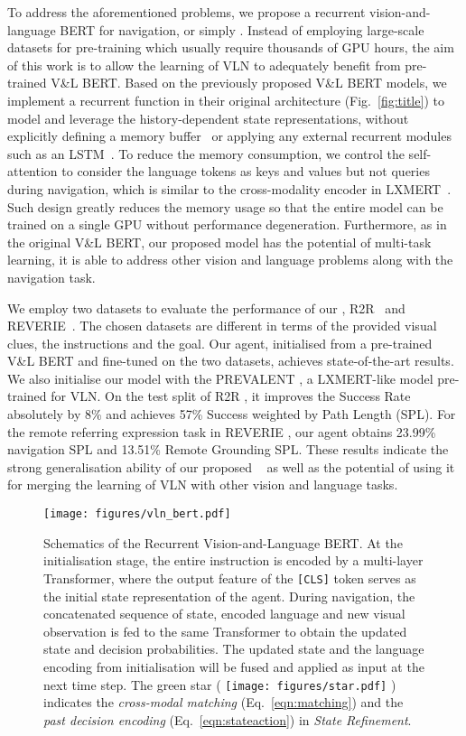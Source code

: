 \documentclass[final]{cvpr}
\DeclareRobustCommand{\star}{\begingroup\normalfont
  \texttt{[image: figures/star.pdf]}\endgroup
}
\begin{document}
To address the aforementioned problems, we propose a recurrent vision-and-language BERT for navigation, or simply \vlnbert. Instead of employing large-scale datasets for pre-training which usually require thousands of GPU hours, the aim of this work is to allow the learning of VLN to adequately benefit from pre-trained V\&L BERT. Based on the previously proposed V\&L BERT models, we implement a recurrent function in their original architecture (Fig.~\ref{fig:title}) to model and leverage the history-dependent state representations, without explicitly defining a memory buffer~\cite{zhu2020babywalk} or applying any external recurrent modules such as an LSTM~\cite{hochreiter1997long}. To reduce the memory consumption, we control the self-attention to consider the language tokens as keys and values but not queries during navigation, which is similar to the cross-modality encoder in LXMERT~\cite{tan2019lxmert}. Such design greatly reduces the memory usage so that the entire model can be trained on a single GPU without performance degeneration. Furthermore, as in the original V\&L BERT, our proposed model has the potential of multi-task learning, it is able to address other vision and language problems along with the navigation task. 

We employ two datasets to evaluate the performance of our \vlnbert, R2R~\cite{anderson2018vision} and REVERIE~\cite{qi2020reverie}. The chosen datasets are different in terms of the provided visual clues, the instructions and the goal. Our agent, initialised from a pre-trained V\&L BERT and fine-tuned on the two datasets, achieves state-of-the-art results. We also initialise our model with the PREVALENT \cite{hao2020towards}, a LXMERT-like model pre-trained for VLN. On the test split of R2R \cite{anderson2018vision}, it improves the Success Rate absolutely by 8\% and achieves 57\% Success weighted by Path Length (SPL). For the remote referring expression task in REVERIE \cite{qi2020reverie}, our agent obtains 23.99\% navigation SPL and 13.51\% Remote Grounding SPL. These results indicate the strong generalisation ability of our proposed \vlnbert~ as well as the potential of using it for merging the learning of VLN with other vision and language tasks.


\begin{figure*}[t]
  \centering
  \texttt{[image: figures/vln\_bert.pdf]}
  \caption{Schematics of the Recurrent Vision-and-Language BERT. At the initialisation stage, the entire instruction is encoded by a multi-layer Transformer, where the output feature of the \texttt{[CLS]} token serves as the initial state representation of the agent. During navigation, the concatenated sequence of state, encoded language and new visual observation is fed to the same Transformer to obtain the updated state and decision probabilities. The updated state and the language encoding from initialisation will be fused and applied as input at the next time step. The green star (\star) indicates the \textit{cross-modal matching} (Eq.~\ref{eqn:matching}) and the \textit{past decision encoding} (Eq.~\ref{eqn:stateaction}) in \textit{State Refinement}.} \label{fig:vln_bert}
  \vspace{-1em}
\end{figure*}
\end{document}
